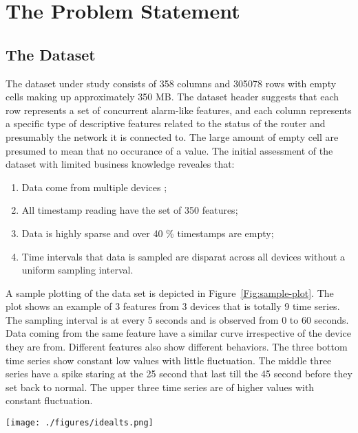 \chapter{The Problem Statement}

\section{The Dataset}

The dataset under study consists of 358 columns and 305078 rows with empty cells making up approximately 350 MB. The dataset header suggests that each row represents a set of concurrent alarm-like features, and each column represents a specific type of descriptive features related to the status of the router and  presumably the network it is connected to. The large amount of empty cell are presumed to mean that no occurance of a value. The initial assessment of the dataset with limited business knowledge reveales that:


\begin{enumerate}
	\item Data come from multiple devices ;
	\item All timestamp reading have the set of 350 features;
	\item Data is highly sparse and over 40 \% timestamps are empty;
	\item Time intervals that data is sampled are disparat across all devices without a uniform sampling interval. 
\end{enumerate}

A sample plotting of the data set is depicted in Figure~\ref{Fig:sample-plot}. The plot shows an example of 3 features from 3 devices that is totally 9 time series. The sampling interval is at every 5 seconds and is observed from 0 to 60 seconds. Data coming from the same feature have a similar curve irrespective of the device they are from. Different features also show different behaviors. The three bottom time series show constant low values with little fluctuation.  The middle three series have a spike staring at the 25 second that last till the 45 second before they set back to normal. The upper three time series are of higher values with constant fluctuation.   

\begin{figure*}
\begin{center}
	\texttt{[image: ./figures/idealts.png]}
	\caption{Plots of 9 time series of 3 features on 3 devices}
	\label{Fig:sample-plot}
\end{center}
\end{figure*}



